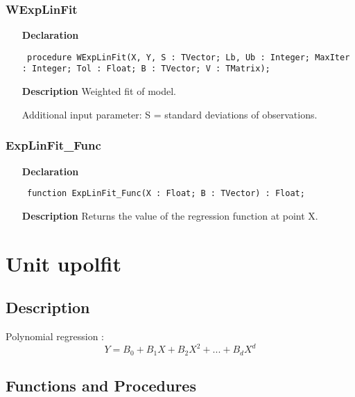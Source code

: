 \documentclass[12pt,a4paper,oneside]{report}
\newcommand{\declarationitem}[1]{\textbf{#1}}
\newcommand{\descriptiontitle}[1]{\textbf{#1}}
\newcommand{\code}[1]{\texttt{#1}}
\begin{document}
\subsubsection{WExpLinFit}
\label{uexlfit-WExpLinFit}
\begin{itemize}\item[\declarationitem{Declaration}\hfill]
	\begin{flushleft}
		\code{
			procedure WExpLinFit(X, Y, S : TVector; Lb, Ub : Integer; MaxIter : Integer; Tol : Float; B : TVector; V : TMatrix);}
		
	\end{flushleft}
	
	\par
	\item[\descriptiontitle{Description}]
	Weighted fit of model.
	
	Additional input parameter: S = standard deviations of observations.
	
\end{itemize}
\subsubsection{ExpLinFit{\_}Func}
\label{uexlfit-ExpLinFit_Func}
\begin{itemize}\item[\declarationitem{Declaration}\hfill]
	\begin{flushleft}
		\code{
			function ExpLinFit{\_}Func(X : Float; B : TVector) : Float;}
		
	\end{flushleft}
	
	\par
	\item[\descriptiontitle{Description}]
	Returns the value of the regression function at point X.
	
\end{itemize}

\section{Unit upolfit}
\label{upolfit}
\subsection{Description}
Polynomial regression : 
$$Y = B_0 + B_1 X + B_2 X^2 + ...+B_d X^d$$ 
\subsection{Functions and Procedures}
\end{document}

